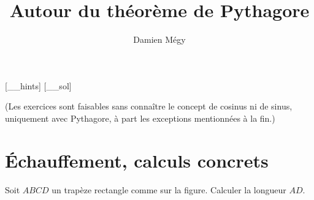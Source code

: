 





[_\jobname_hints]
[_\jobname_sol]


\title{Autour du théorème de Pythagore}
\author{Damien Mégy}
\maketitle

\avertissement 

(Les exercices sont faisables sans connaître le concept de cosinus ni de sinus, uniquement avec Pythagore, à part les exceptions mentionnées à la fin.)

\tableofcontents




\section{Échauffement, calculs concrets}

\begin{exo}
Soit $ABCD$ un trapèze rectangle comme sur la figure.
Calculer la longueur $AD$.
\begin{center}
\end{center}
\end{exo}

